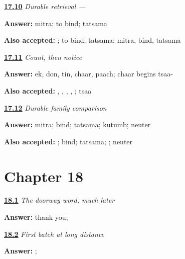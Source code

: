 \noindent\begin{minipage}[t]{\linewidth}
\raggedright
\hyperlink{review-MR-R14-mitra-r3-check}{\textbf{17.10}} \emph{Durable retrieval — }\par
\small \textbf{Answer:} mitra; to bind; tatsama\par
\footnotesize \textbf{Also accepted:} ; to bind; tatsama; mitra, bind, tatsama
\end{minipage}\par\medskip

\noindent\begin{minipage}[t]{\linewidth}
\raggedright
\hyperlink{review-MR-R14-numbers-check}{\textbf{17.11}} \emph{Count, then notice}\par
\small \textbf{Answer:} ek, don, tin, chaar, paach; chaar begins tsaa-\par
\footnotesize \textbf{Also accepted:} , , , , ; tsaa
\end{minipage}\par\medskip

\noindent\begin{minipage}[t]{\linewidth}
\raggedright
\hyperlink{review-MR-R14-kutumb-r3-check}{\textbf{17.12}} \emph{Durable family comparison}\par
\small \textbf{Answer:} mitra; bind; tatsama; kutumb; neuter\par
\footnotesize \textbf{Also accepted:} ; bind; tatsama; ; neuter
\end{minipage}\par\medskip

\section*{Chapter 18}

\noindent\begin{minipage}[t]{\linewidth}
\raggedright
\hyperlink{review-MR-R18-script-warmup-check}{\textbf{18.1}} \emph{The doorway word, much later}\par
\small \textbf{Answer:} thank you; \par
\end{minipage}\par\medskip

\noindent\begin{minipage}[t]{\linewidth}
\raggedright
\hyperlink{review-MR-R18-script-a-r4-check}{\textbf{18.2}} \emph{First batch at long distance}\par
\small \textbf{Answer:} ;   \par
\end{minipage}\par\medskip

